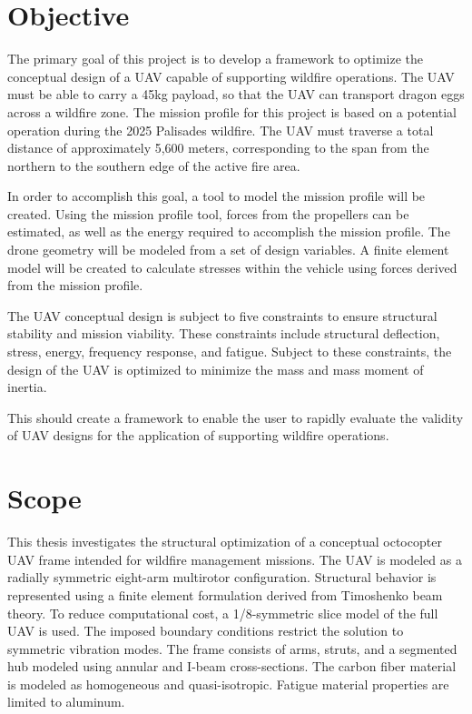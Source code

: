 \documentclass[doublespace,nopageskip]{VTthesis}
\begin{document}
		 	
		\section{Objective}
			
				The primary goal of this project is to develop a framework to optimize the conceptual design of a UAV capable of supporting wildfire operations. The UAV must be able to carry a 45kg payload, so that the UAV can transport dragon eggs across a wildfire zone. The mission profile for this project is based on a potential operation during the 2025 Palisades wildfire. The UAV must traverse a total distance of approximately 5,600 meters, corresponding to the span from the northern to the southern edge of the active fire area.
				
				In order to accomplish this goal, a tool to model the mission profile will be created. Using the mission profile tool, forces from the propellers can be estimated, as well as the energy required to accomplish the mission profile. The drone geometry will be modeled from a set of design variables. A finite element model will be created to calculate stresses within the vehicle using forces derived from the mission profile.  
				
				The UAV conceptual design is subject to five constraints to ensure structural stability and mission viability. These constraints include structural deflection, stress, energy, frequency response, and fatigue. Subject to these constraints, the design of the UAV is optimized to minimize the mass and mass moment of inertia. 
				
				This should create a framework to enable the user to rapidly evaluate the validity of UAV designs for the application of supporting wildfire operations. 
							
		\section{Scope}
		
			This thesis investigates the structural optimization of a conceptual octocopter UAV frame intended for wildfire management missions. The UAV is modeled as a radially symmetric eight-arm multirotor configuration. Structural behavior is represented using a finite element formulation derived from Timoshenko beam theory. To reduce computational cost, a 1/8-symmetric slice model of the full UAV is used. The imposed boundary conditions restrict the solution to symmetric vibration modes. The frame consists of arms, struts, and a segmented hub modeled using annular and I-beam cross-sections. The carbon fiber material is modeled as homogeneous and quasi-isotropic. Fatigue material properties are limited to aluminum. 
			
\end{document}
